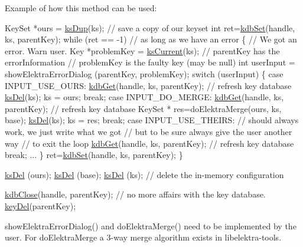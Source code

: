 \begin{DoxyParagraph}{Example of how this method can be used\-:}
\begin{DoxyCode}
KeySet *ours = \hyperlink{group__keyset_gac59e4b328245463f1451f68d5106151c}{ksDup}(ks); \textcolor{comment}{// save a copy of our keyset}
\textcolor{keywordtype}{int} ret=\hyperlink{group__kdb_ga11436b058408f83d303ca5e996832bcf}{kdbSet}(handle, ks, parentKey);
\textcolor{keywordflow}{while} (ret == -1) \textcolor{comment}{// as long as we have an error}
\{
        \textcolor{comment}{// We got an error. Warn user.}
        Key *problemKey = \hyperlink{group__keyset_ga4287b9416912c5f2ab9c195cb74fb094}{ksCurrent}(ks);
        \textcolor{comment}{// parentKey has the errorInformation}
        \textcolor{comment}{// problemKey is the faulty key (may be null)}
        \textcolor{keywordtype}{int} userInput = showElektraErrorDialog (parentKey, problemKey);
        \textcolor{keywordflow}{switch} (userInput)
        \{
        \textcolor{keywordflow}{case} INPUT\_USE\_OURS:
                \hyperlink{group__kdb_ga28e385fd9cb7ccfe0b2f1ed2f62453a1}{kdbGet}(handle, ks, parentKey); \textcolor{comment}{// refresh key database}
                \hyperlink{group__keyset_ga27e5c16473b02a422238c8d970db7ac8}{ksDel}(ks);
                ks = ours;
                \textcolor{keywordflow}{break};
        \textcolor{keywordflow}{case} INPUT\_DO\_MERGE:
                \hyperlink{group__kdb_ga28e385fd9cb7ccfe0b2f1ed2f62453a1}{kdbGet}(handle, ks, parentKey); \textcolor{comment}{// refresh key database}
                KeySet * res=doElektraMerge(ours, ks, base);
                \hyperlink{group__keyset_ga27e5c16473b02a422238c8d970db7ac8}{ksDel}(ks);
                ks = res;
                \textcolor{keywordflow}{break};
        \textcolor{keywordflow}{case} INPUT\_USE\_THEIRS:
                \textcolor{comment}{// should always work, we just write what we got}
                \textcolor{comment}{// but to be sure always give the user another way}
                \textcolor{comment}{// to exit the loop}
                \hyperlink{group__kdb_ga28e385fd9cb7ccfe0b2f1ed2f62453a1}{kdbGet}(handle, ks, parentKey); \textcolor{comment}{// refresh key database}
                \textcolor{keywordflow}{break};
        ...
        \}
        ret=\hyperlink{group__kdb_ga11436b058408f83d303ca5e996832bcf}{kdbSet}(handle, ks, parentKey);
\}

\hyperlink{group__keyset_ga27e5c16473b02a422238c8d970db7ac8}{ksDel} (ours);
\hyperlink{group__keyset_ga27e5c16473b02a422238c8d970db7ac8}{ksDel} (base);
\hyperlink{group__keyset_ga27e5c16473b02a422238c8d970db7ac8}{ksDel} (ks); \textcolor{comment}{// delete the in-memory configuration}

\hyperlink{group__kdb_gadb54dc9fda17ee07deb9444df745c96f}{kdbClose}(handle, parentKey); \textcolor{comment}{// no more affairs with the key database.}
\hyperlink{group__key_ga3df95bbc2494e3e6703ece5639be5bb1}{keyDel}(parentKey);
\end{DoxyCode}

\end{DoxyParagraph}
show\-Elektra\-Error\-Dialog() and do\-Elektra\-Merge() need to be implemented by the user. For do\-Elektra\-Merge a 3-\/way merge algorithm exists in libelektra-\/tools.


